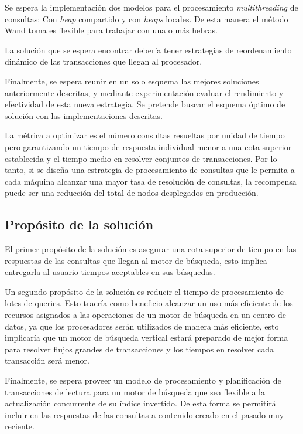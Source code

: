 Se espera la implementación dos modelos para el procesamiento \textit{multithreading }de consultas: Con \textit{heap} compartido y con \textit{heaps} locales. De esta manera el método Wand toma es flexible para trabajar con una o más hebras. 

La solución que se espera encontrar debería tener estrategias de reordenamiento dinámico de las transacciones que llegan al procesador. 

Finalmente, se espera reunir en un solo esquema las mejores soluciones anteriormente descritas, y mediante experimentación evaluar el rendimiento y efectividad de esta nueva estrategia. Se pretende buscar el esquema óptimo de solución con las implementaciones descritas.

La métrica a optimizar es el número consultas resueltas por unidad de tiempo pero garantizando un tiempo de respuesta individual menor a una cota superior establecida y el tiempo medio en resolver conjuntos de transacciones. Por lo tanto, si se diseña una estrategia de procesamiento de consultas que le permita a cada máquina alcanzar una mayor tasa de resolución de consultas, la recompensa puede ser una reducción del total de nodos desplegados en producción.


\subsection{Prop\'osito de la solución}
\label{intro:propositosolucion}

El primer propósito de la solución es asegurar una cota superior de tiempo en las respuestas de las consultas que llegan al motor de búsqueda, esto implica entregarla al usuario tiempos aceptables en sus búsquedas.

Un segundo propósito de la solución es reducir el tiempo de procesamiento de lotes de queries. Esto traería como beneficio alcanzar un uso más eficiente de los recursos asignados a las operaciones de un motor de búsqueda en un centro de datos, ya que los procesadores serán utilizados de manera más eficiente, esto implicaría que un motor de búsqueda vertical estará preparado de mejor forma para resolver flujos grandes de transacciones y los tiempos en resolver cada transacción será menor.

Finalmente, se espera proveer un modelo de procesamiento y planificación de transacciones de lectura para un motor de búsqueda que sea flexible a la actualización concurrente de su índice invertido. De esta forma se permitirá incluir en las respuestas de las consultas a contenido creado en el pasado muy reciente.

